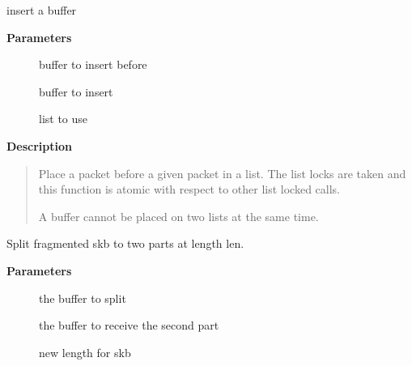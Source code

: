 \documentclass[a4paper,8pt,english]{sphinxmanual}
\begin{document}
\begin{fulllineitems}
\label{networking/kapi:c.skb_insert}
insert a buffer

\end{fulllineitems}


\textbf{Parameters}
\begin{description}
\item[{}] \leavevmode
buffer to insert before

\item[{}] \leavevmode
buffer to insert

\item[{}] \leavevmode
list to use

\end{description}

\textbf{Description}
\begin{quote}

Place a packet before a given packet in a list. The list locks are
taken and this function is atomic with respect to other list locked
calls.

A buffer cannot be placed on two lists at the same time.
\end{quote}

\begin{fulllineitems}
\label{networking/kapi:c.skb_split}
Split fragmented skb to two parts at length len.

\end{fulllineitems}


\textbf{Parameters}
\begin{description}
\item[{}] \leavevmode
the buffer to split

\item[{}] \leavevmode
the buffer to receive the second part

\item[{}] \leavevmode
new length for skb

\end{description}
\end{document}
